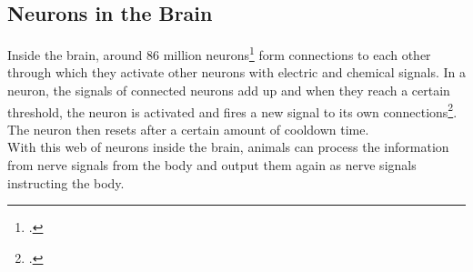 \documentclass[11pt]{report}
\begin{document}
            \subsection{Neurons in the Brain}\label{subsec:neurons-in-the-brain}
    Inside the brain, around 86 million neurons\footcite{caruso_23} form connections to each other through which they activate other neurons with electric and chemical signals.
    In a neuron, the signals of connected neurons add up and when they reach a certain threshold, the neuron is activated and fires a new signal to its own connections\footcite{Newman_23}.
    The neuron then resets after a certain amount of cooldown time.
    \\
    With this web of neurons inside the brain, animals can process the information from nerve signals from the body and output them again as nerve signals instructing the body.
\end{document}
